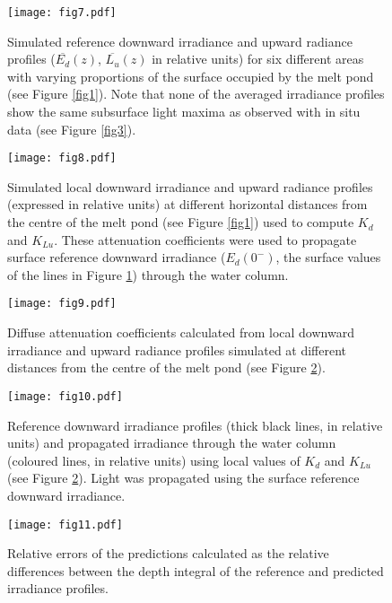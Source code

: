 \documentclass[applsci,article,accept,moreauthors,pdftex,10pt,a4paper]{Definitions/mdpi}
\newcommand{\ked}{\ensuremath{K_{d}}}
\newcommand{\klu}{\ensuremath{K_{Lu}}}
\newcommand{\edzero}{\ensuremath{{E_d(0^-)}}}
\newcommand{\meanedz}{\ensuremath{{\overline{E_d}(z)}}}
\newcommand{\meanluz}{\ensuremath{{\overline{L_u}(z)}}}
\begin{document}
\begin{figure}[H]
	\centering
	\texttt{[image: fig7.pdf]}
	\caption{Simulated reference downward irradiance and upward radiance profiles (\meanedz{}, \meanluz{} in relative units) for six different areas with varying proportions of the surface occupied by the melt pond (see Figure \ref{fig1}). Note that none of the averaged irradiance profiles show the same subsurface light maxima as observed with in situ data (see Figure \ref{fig3}).}\label{fig7}
\end{figure}



\begin{figure}[H]
	\centering
	\texttt{[image: fig8.pdf]}
	\caption{Simulated local downward irradiance and upward radiance profiles (expressed in relative units) at different horizontal distances from the centre of the melt pond (see Figure \ref{fig1}) used to compute \ked{} and \klu{}. These attenuation coefficients were used to propagate surface reference downward irradiance (\edzero{}, the surface values of the lines in Figure \ref{fig7}) through the water column.}\label{fig8}
\end{figure}



\begin{figure}[H]
	\centering
	\texttt{[image: fig9.pdf]}
	\caption{Diffuse attenuation %
	coefficients calculated from local downward irradiance and upward radiance profiles simulated at different distances from the centre of the melt pond (see Figure \ref{fig8}).}\label{fig9}
\end{figure}


\begin{figure}[H]
	\centering
	\texttt{[image: fig10.pdf]}
	\caption{Reference downward irradiance profiles (thick black lines, in relative units) and propagated irradiance through the water column (coloured lines, in relative units) using local values of \ked{} and \klu{} (see Figure \ref{fig8}). Light was propagated using the surface reference downward irradiance.}\label{fig10}
\end{figure}

\begin{figure}[H]
	\centering
	\texttt{[image: fig11.pdf]}
	\caption{Relative errors of the predictions calculated as the relative differences between the depth integral of the reference and predicted irradiance profiles.}\label{fig11}
\end{figure}
\end{document}
